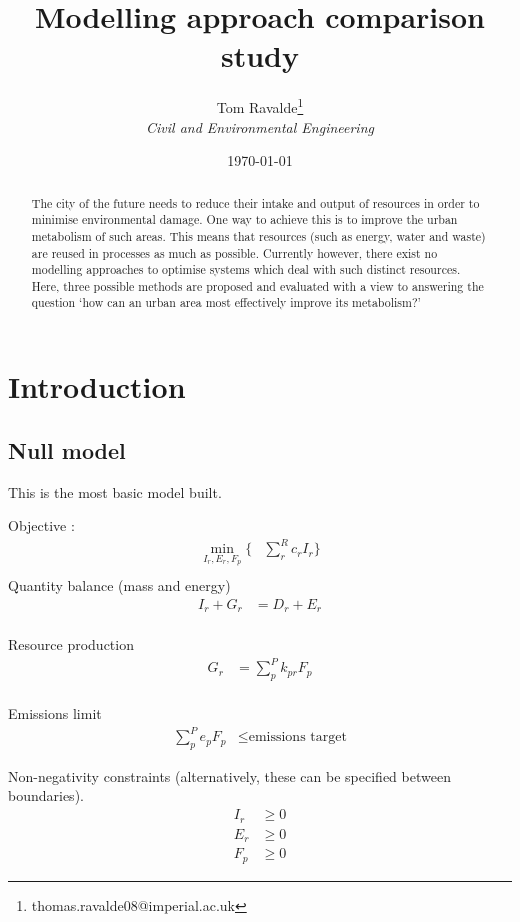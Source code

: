 \documentclass[a4paper]{article}\usepackage{graphicx, color}
\title{Modelling approach comparison study}
\author{Tom Ravalde\thanks{thomas.ravalde08@imperial.ac.uk} \\[0.3em]
\emph{Civil and Environmental Engineering}}
\date{\today}
\begin{document}
\maketitle
\thispagestyle{empty}

\bigskip \bigskip
\begin{abstract}
	The city of the future needs to reduce their intake and output of resources in order to minimise environmental damage. One way to achieve this is to improve the urban metabolism of such areas. This means that resources (such as energy, water and waste) are reused in processes as much as possible. Currently however, there exist no modelling approaches to optimise systems which deal with such distinct resources. Here, three possible methods are proposed and evaluated with a view to answering the question `how can an urban area most effectively improve its metabolism?'
\end{abstract}

\section{Introduction}

\subsection{Null model}
This is the most basic model built.

Objective :
\begin{align}
\min_{I_r,E_r,F_p} \Bigg\{&\sum_{r}^R c_rI_{r} \Bigg\} \\
\end{align}
Quantity balance (mass and energy)
\begin{align}
I_r+G_r &= D_r + E_r \\
\end{align}

Resource production
\begin{align}
G_r&=\sum_{p}^{P}k_{pr} F_p \\
\end{align}

Emissions limit
\begin{align}
\sum_{p}^P e_p F_p &\leq \mbox{emissions target} 
\end{align}

Non-negativity constraints (alternatively, these can be specified between boundaries).
\begin{align}
I_r &\geq 0 \label{eq:tat_basic_imports} \\
E_r &\geq 0 \\
F_p &\geq 0 
\end{align}
\end{document}
